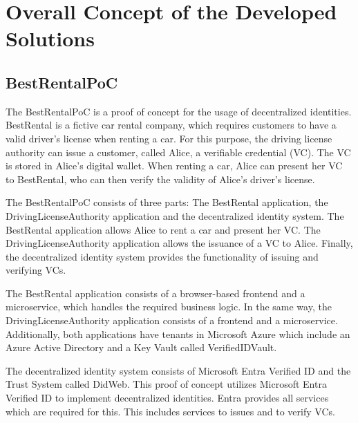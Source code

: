\chapter{Overall Concept of the Developed Solutions}



\section{BestRentalPoC}

The \Gls{BestRentalPoC} is a proof of concept for the usage of decentralized identities.
\Gls{BestRental} is a fictive car rental company, which requires customers to have a valid driver's license
when renting a car.
For this purpose, the driving license authority can issue a customer, called Alice, a verifiable credential (VC).
The VC is stored in Alice's digital wallet.
When renting a car, \Gls{Alice} can present her VC to BestRental, who can then verify the validity of Alice's driver's license.

The \Gls{BestRentalPoC} consists of three parts: The \Gls{BestRental} application, the DrivingLicenseAuthority application
and the decentralized identity system.
The \Gls{BestRental} application allows \Gls{Alice} to rent a car and present her VC.
The DrivingLicenseAuthority application allows the issuance of a VC to Alice.
Finally, the decentralized identity system provides the functionality of issuing and verifying VCs.

The \Gls{BestRental} application consists of a browser-based frontend and a microservice, which handles the required
business logic. In the same way, the DrivingLicenseAuthority application consists of a frontend and a microservice.
Additionally, both applications have tenants in Microsoft Azure which include an Azure Active Directory and
a Key Vault called VerifiedIDVault.

The decentralized identity system consists of Microsoft Entra Verified ID and the Trust System called DidWeb.
This proof of concept utilizes Microsoft Entra Verified ID to implement decentralized identities.
Entra provides all services which are required for this. This includes services to issues and to verify VCs.

